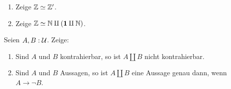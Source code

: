 \documentclass{uebung}
\begin{document}

\begin{exercise}
  \begin{enumerate}
    \item Zeige $\mathbb{Z} \simeq \mathbb{Z}'$.
    \item Zeige $\mathbb{Z} \simeq \mathbb{N} \amalg (\mathbf{1} \amalg \mathbb{N})$.
  \end{enumerate}
\end{exercise}

\begin{exercise}
  Seien $A,B:\mathcal{U}$.
  Zeige:
  \begin{enumerate}
    \item Sind $A$ und $B$ kontrahierbar, so ist $A \amalg B$ nicht kontrahierbar.
    \item Sind $A$ und $B$ Aussagen, so ist $A \amalg B$ eine Aussage genau dann, wenn $A \to \neg B$.
  \end{enumerate}
\end{exercise}
\end{document}
